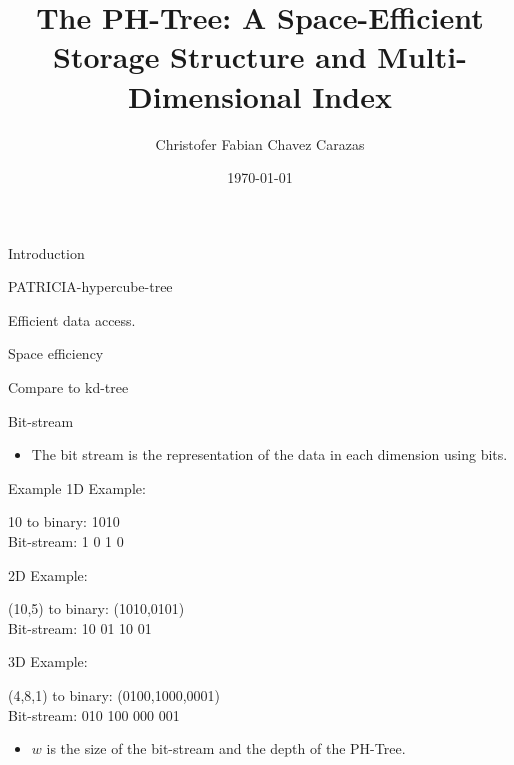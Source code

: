 \documentclass{beamer}
\title{The PH-Tree: A Space-Efficient Storage Structure and Multi-Dimensional Index}
\author{Christofer Fabian Chavez Carazas}
\institute{National University of Saint Augustine}
\date{\today}
\begin{document}
 
 \begin{frame}
  \titlepage
 \end{frame}

\begin{frame}{Introduction}
  \begin{block}{}
    PATRICIA-hypercube-tree
   \end{block}
  \begin{block}{}
   Efficient data access.
  \end{block}
  \begin{block}{}
   Space efficiency
  \end{block}
  \begin{block}{}
   Compare to kd-tree
  \end{block}
\end{frame}

\begin{frame}{Bit-stream}
  \begin{itemize}
    \item The bit stream is the representation of the data in each dimension using bits.
  \end{itemize}
  \begin{block}{Example}
   1D Example: \\
   \begin{center}
      10 to binary: 1010  \\
      Bit-stream: 1 0 1 0
   \end{center}
   2D Example: \\
   \begin{center}
      (10,5) to binary: (1010,0101) \\
      Bit-stream: 10 01 10 01
   \end{center}
   3D Example: \\
   \begin{center}
      (4,8,1) to binary: (0100,1000,0001) \\
      Bit-stream: 010 100 000 001
   \end{center}
  \end{block}
  \begin{itemize}
   \item $w$ is the size of the bit-stream and the depth of the PH-Tree.
  \end{itemize}
\end{frame}
\end{document}
